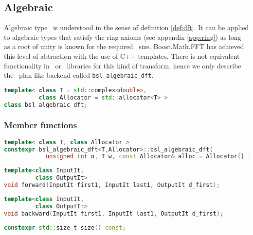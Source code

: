 \subsection{Algebraic \dft}
Algebraic type \dft\ is understood in the sense of definition \ref{def:dft}.
It can be applied to algebraic types that satisfy the ring axioms (see appendix
\ref{app:ring}) as long as a root of unity is known for the required \dft\ size.
Boost.Math.FFT has achieved this level of abtraction with the use of C++
templates. There is not equivalent functionality in \gsl\ or \fftw\ libraries
for this kind of transform, hence we only describe the \bsl\ plan-like backend
called \verb|bsl_algebraic_dft|.
\begin{lstlisting}[language=C++,caption=Algebraic plan.]
template< class T = std::complex<double>, 
          class Allocator = std::allocator<T> >
class bsl_algebraic_dft;
\end{lstlisting}

\subsubsection*{Member functions}
\begin{lstlisting}[language=C++,caption=Algebraic plan constructor.]
template< class T, class Allocator >
constexpr bsl_algebraic_dft<T,Allocator>::bsl_algebraic_dft(
            unsigned int n, T w, const Allocator& alloc = Allocator{} );
\end{lstlisting}
\begin{lstlisting}[language=C++,caption=Algebraic plan forward function.]
template<class InputIt,
         class OutputIt>
void forward(InputIt first1, InputIt last1, OutputIt d_first);
\end{lstlisting}
\begin{lstlisting}[language=C++,caption=Algebraic plan backward function.]
template<class InputIt,
         class OutputIt>
void backward(InputIt first1, InputIt last1, OutputIt d_first);
\end{lstlisting}
\begin{lstlisting}[language=C++,caption=Size.]
constexpr std::size_t size() const;
\end{lstlisting}


